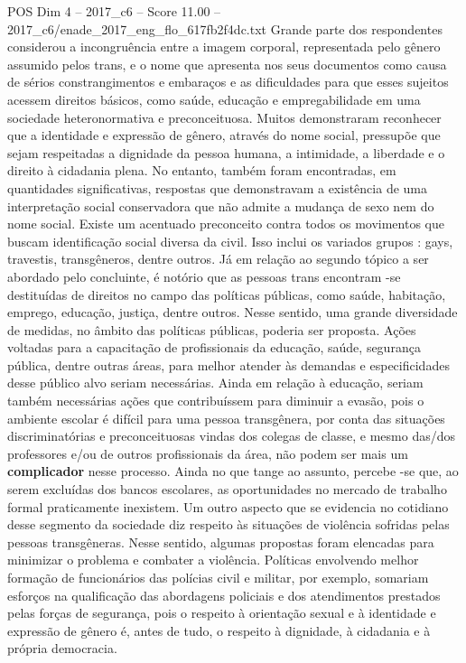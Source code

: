 \begin{textsample}{POS Dim 4 – 2017\_c6 – Score 11.00 – 2017\_c6/enade\_2017\_eng\_flo\_617fb2f4dc.txt}
Grande parte dos respondentes considerou a incongruência entre a imagem corporal, representada pelo gênero assumido pelos trans, e o nome que apresenta nos seus documentos como causa de sérios constrangimentos e embaraços e as dificuldades para que esses sujeitos acessem direitos básicos, como saúde, educação e empregabilidade em uma sociedade heteronormativa e preconceituosa.
Muitos demonstraram reconhecer que a identidade e expressão de gênero, através do nome social, pressupõe que sejam respeitadas a dignidade da pessoa humana, a intimidade, a liberdade e o direito à cidadania plena.
No entanto, também foram encontradas, em quantidades significativas, respostas que demonstravam a existência de uma interpretação social conservadora que não admite a mudança de sexo nem do nome social.
Existe um acentuado preconceito contra todos os movimentos que buscam identificação social diversa da civil.
Isso inclui os variados grupos : gays, travestis, transgêneros, dentre outros.
Já em relação ao segundo tópico a ser abordado pelo concluinte, é notório que as pessoas trans encontram -se destituídas de direitos no campo das políticas públicas, como saúde, habitação, emprego, educação, justiça, dentre outros.
Nesse sentido, uma grande diversidade de medidas, no âmbito das políticas públicas, poderia ser proposta.
Ações voltadas para a capacitação de profissionais da educação, saúde, segurança pública, dentre outras áreas, para melhor atender às demandas e especificidades desse público alvo seriam necessárias.
Ainda em relação à educação, seriam também necessárias ações que contribuíssem para diminuir a evasão, pois o ambiente escolar é difícil para uma pessoa transgênera, por conta das situações discriminatórias e preconceituosas vindas dos colegas de classe, e mesmo das/dos professores e/ou de outros profissionais da área, não podem ser mais um \textbf{complicador} nesse processo.
Ainda no que tange ao assunto, percebe -se que, ao serem excluídas dos bancos escolares, as oportunidades no mercado de trabalho formal praticamente inexistem.
Um outro aspecto que se evidencia no cotidiano desse segmento da sociedade diz respeito às situações de violência sofridas pelas pessoas transgêneras.
Nesse sentido, algumas propostas foram elencadas para minimizar o problema e combater a violência.
Políticas envolvendo melhor formação de funcionários das polícias civil e militar, por exemplo, somariam esforços na qualificação das abordagens policiais e dos atendimentos prestados pelas forças de segurança, pois o respeito à orientação sexual e à identidade e expressão de gênero é, antes de tudo, o respeito à dignidade, à cidadania e à própria democracia.

\end{textsample}
